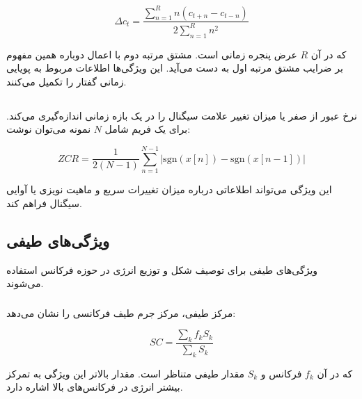 \begin{equation}
\Delta c_t
=
\frac{
\sum_{n=1}^{R}
n(c_{t+n}-c_{t-n})
}{
2\sum_{n=1}^{R}n^2
}
\end{equation}

که در آن $R$ عرض پنجره زمانی است. مشتق مرتبه دوم با اعمال دوباره همین مفهوم بر ضرایب مشتق مرتبه اول به دست می‌آید. این ویژگی‌ها اطلاعات مربوط به پویایی زمانی گفتار را تکمیل می‌کنند.


\subsection{}

نرخ عبور از صفر یا
میزان تغییر علامت سیگنال را در یک بازه زمانی اندازه‌گیری می‌کند. برای یک فریم شامل $N$ نمونه می‌توان نوشت:

\begin{equation}
ZCR
=
\frac{1}{2(N-1)}
\sum_{n=1}^{N-1}
\left|
\mathrm{sgn}(x[n])
-
\mathrm{sgn}(x[n-1])
\right|
\end{equation}

این ویژگی می‌تواند اطلاعاتی درباره میزان تغییرات سریع و ماهیت نویزی یا آوایی سیگنال فراهم کند.


\subsection{ویژگی‌های طیفی}

ویژگی‌های طیفی برای توصیف شکل و توزیع انرژی در حوزه فرکانس استفاده می‌شوند.


\subsubsection{}

مرکز طیفی، مرکز جرم طیف فرکانسی را نشان می‌دهد:

\begin{equation}
SC
=
\frac{
\sum_k f_k S_k
}{
\sum_k S_k
}
\end{equation}

که در آن $f_k$ فرکانس و $S_k$ مقدار طیفی متناظر است. مقدار بالاتر این ویژگی به تمرکز بیشتر انرژی در فرکانس‌های بالا اشاره دارد.


\subsubsection{}

